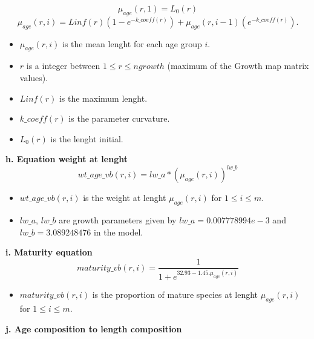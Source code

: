 \documentclass{article}
\begin{document}
\begin{equation}
    \mu_{age}(r,1)=L_0(r)
\end{equation}
\begin{equation}
    \mu_{age}(r,i)=Linf(r)(1-e^{-{k\_coeff(r)}})+\mu_{age}(r,i-1)(e^{-k\_{coeff(r)}}).
\end{equation}
 \begin{itemize}
    \item $\mu_{age}(r,i)$ is the mean lenght for each age group $i$.
     \item $r$ is a integer between $1\leq r \leq ngrowth$ (maximum of the Growth map matrix values). 
     \item $Linf(r)$ is the maximum lenght.
     \item $k\_coeff(r)$ is the parameter curvature.
     \item $L_0(r)$ is the lenght initial.
     
 \end{itemize}

\hfill

\textbf{h. Equation weight at lenght}\\
\begin{equation}
     wt\_age\_vb(r,i) = lw\_a * \left(\mu_{age}(r,i)\right)^{lw\_b}
 \end{equation}
 \begin{itemize}
     \item $wt\_age\_vb(r,i)$ is the weight at lenght $\mu_{age}(r,i)$ for $1\leq i \leq m$.
     \item $lw\_a$, $lw\_b$ are growth parameters given by  $lw\_a=0.007778994e-3$ and $lw\_b=3.089248476$ in the model.
 \end{itemize}

\hfill

\textbf{i. Maturity equation}\\
 \begin{equation}
    maturity\_vb(r,i) = \dfrac{1}{1+e^{32.93-1.45.\mu_{age}(r,i)}}
\end{equation}
\begin{itemize}
    \item $maturity\_vb(r,i)$ is the proportion of mature species at lenght $\mu_{age}(r,i)$ for $1\leq i \leq m$.
\end{itemize}

\hfill

\textbf{j. Age composition to length composition}\\
\end{document}
